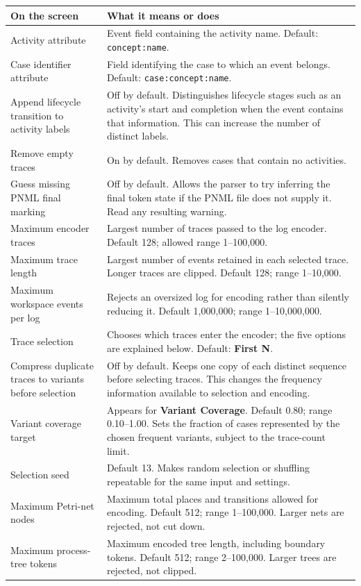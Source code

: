 \documentclass[11pt,a4paper]{article}
\makeatletter
\newcommand{\ui}[1]{\textbf{#1}}
\newcommand{\code}[1]{\nolinkurl{#1}}
\newenvironment{controls}{%
  \small\begin{longtable}{@{}>{\raggedright\arraybackslash}p{.34\linewidth}
    >{\raggedright\arraybackslash}p{.62\linewidth}@{}}
  \toprule\textbf{On the screen} & \textbf{What it means or does}\\\midrule\endhead
  \bottomrule\endfoot
}{\end{longtable}\normalsize}
\makeatother
\begin{document}
\begin{controls}
Activity attribute & Event field containing the activity name.
Default: \code{concept:name}.\\
Case identifier attribute & Field identifying the case to which an event
belongs. Default: \code{case:concept:name}.\\
Append lifecycle transition to activity labels & Off by default. Distinguishes
lifecycle stages such as an activity's start and completion when the event
contains that information. This can increase the number of distinct labels.\\
Remove empty traces & On by default. Removes cases that contain no activities.\\
Guess missing PNML final marking & Off by default. Allows the parser to try
inferring the final token state if the PNML file does not supply it. Read any
resulting warning.\\
Maximum encoder traces & Largest number of traces passed to the log encoder.
Default 128; allowed range 1--100,000.\\
Maximum trace length & Largest number of events retained in each selected
trace. Longer traces are clipped. Default 128; range 1--10,000.\\
Maximum workspace events per log & Rejects an oversized log for encoding
rather than silently reducing it. Default 1,000,000; range 1--10,000,000.\\
Trace selection & Chooses which traces enter the encoder; the five options
are explained below. Default: \ui{First N}.\\
Compress duplicate traces to variants before selection & Off by default.
Keeps one copy of each distinct sequence before selecting traces. This changes
the frequency information available to selection and encoding.\\
Variant coverage target & Appears for \ui{Variant Coverage}. Default 0.80;
range 0.10--1.00. Sets the fraction of cases represented by the chosen frequent
variants, subject to the trace-count limit.\\
Selection seed & Default 13. Makes random selection or shuffling repeatable
for the same input and settings.\\
Maximum Petri-net nodes & Maximum total places and transitions allowed for
encoding. Default 512; range 1--100,000. Larger nets are rejected, not cut down.\\
Maximum process-tree tokens & Maximum encoded tree length, including boundary
tokens. Default 512; range 2--100,000. Larger trees are rejected, not clipped.\\
\end{controls}
\end{document}
